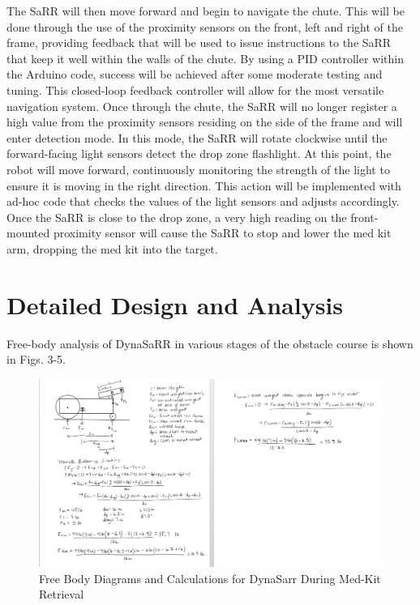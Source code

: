 \documentclass[12pt]{article}
\begin{document}
The SaRR will then move forward and begin to navigate the chute. This will be done through the use of the proximity sensors on the front, left and right of the frame, providing feedback that will be used to issue instructions to the SaRR that keep it well within the walls of the chute. By using a PID controller within the Arduino code, success will be achieved after some moderate testing and tuning. This closed-loop feedback controller will allow for the most versatile navigation system.
Once through the chute, the SaRR will no longer register a high value from the proximity sensors residing on the side of the frame and will enter detection mode. In this mode, the SaRR will rotate clockwise until the forward-facing light sensors detect the drop zone flashlight. At this point, the robot will move forward, continuously monitoring the strength of the light to ensure it is moving in the right direction. This action will be implemented with ad-hoc code that checks the values of the light sensors and adjusts accordingly. Once the SaRR is close to the drop zone, a very high reading on the front-mounted proximity sensor will cause the SaRR to stop and lower the med kit arm, dropping the med kit into the target.\\


\section{Detailed Design and Analysis}

Free-body analysis of DynaSaRR in various stages of the obstacle course is shown in Figs. 3-5.

\begin{figure}[H]
    \centering
    \includegraphics[width=1.2\linewidth]{PreliminaryDesignReport/1.png}
    \caption{Free Body Diagrams and Calculations for DynaSarr During Med-Kit Retrieval}
    \label{fig:my_label}
\end{figure}
\end{document}
